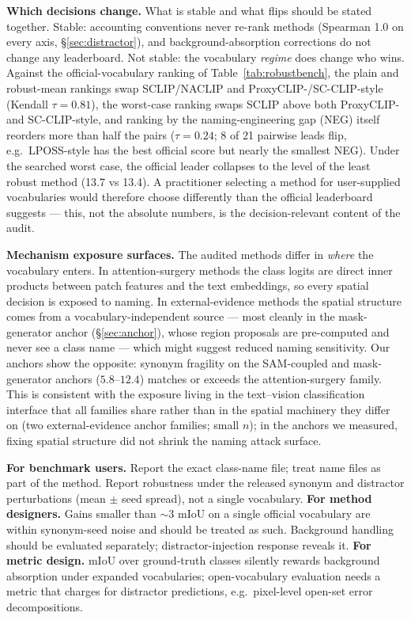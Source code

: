\documentclass[11pt]{article}
\newcommand{\miou}{mIoU}
\begin{document}
\textbf{Which decisions change.} What is stable and what flips should be
stated together. Stable: accounting conventions never re-rank methods
(Spearman 1.0 on every axis, \S\ref{sec:distractor}), and background-absorption
corrections do not change any leaderboard. Not stable: the vocabulary
\emph{regime} does change who wins. Against the official-vocabulary ranking of
Table~\ref{tab:robustbench}, the plain and robust-mean rankings swap
SCLIP/NACLIP and ProxyCLIP-/SC-CLIP-style (Kendall $\tau=0.81$), the
worst-case ranking swaps SCLIP above both ProxyCLIP- and SC-CLIP-style, and
ranking by the naming-engineering gap (NEG) itself reorders more than half the
pairs ($\tau=0.24$; 8 of 21 pairwise leads flip, e.g.\ LPOSS-style has the
best official score but nearly the smallest NEG). Under the searched worst
case, the official leader collapses to the level of the least robust method
(13.7 vs 13.4). A practitioner selecting a method for user-supplied
vocabularies would therefore choose differently than the official leaderboard
suggests --- this, not the absolute numbers, is the decision-relevant content
of the audit.

\textbf{Mechanism exposure surfaces.} The audited methods differ in
\emph{where} the vocabulary enters. In attention-surgery methods the class
logits are direct inner products between patch features and the text
embeddings, so every spatial decision is exposed to naming. In
external-evidence methods the spatial structure comes from a
vocabulary-independent source --- most cleanly in the mask-generator anchor
(\S\ref{sec:anchor}), whose region proposals are pre-computed and never see
a class name --- which might suggest reduced naming sensitivity. Our anchors
show the opposite: synonym fragility on the SAM-coupled and mask-generator
anchors ($5.8$--$12.4$) matches or exceeds the attention-surgery family.
This is consistent with the exposure living in the text--vision
classification interface that all families share rather than in the spatial
machinery they differ on (two external-evidence anchor families; small $n$);
in the anchors we measured, fixing spatial structure did not shrink the
naming attack surface.

\textbf{For benchmark users.} Report the exact class-name file; treat name files as part
of the method. Report robustness under the released synonym and distractor
perturbations (mean $\pm$ seed spread), not a single vocabulary.
\textbf{For method designers.} Gains smaller than $\sim$3 \miou{} on a single official
vocabulary are within synonym-seed noise and should be treated as such. Background
handling should be evaluated separately; distractor-injection response reveals it.
\textbf{For metric design.} \miou{} over ground-truth classes silently rewards
background absorption under expanded vocabularies; open-vocabulary evaluation needs a
metric that charges for distractor predictions, e.g.\ pixel-level open-set error
decompositions.
\end{document}
